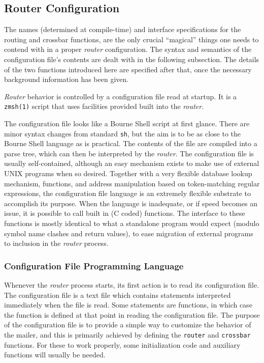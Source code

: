 \subsection{Router Configuration}



The names (determined at compile-time) and interface specifications for the
routing and crossbar functions, are the only crucial ``magical'' things one
needs to contend with in a proper {\em router\/} configuration.  The syntax and
semantics of the configuration file's contents are dealt with in the
following subsection. The details of the two functions introduced here are
specified after that, once the necessary background information has been
given.

{\em Router\/} behavior is controlled by a configuration file read at 
startup. It is a {\tt zmsh(1)} script that uses facilities provided 
built into the {\em router\/}. 

The configuration file looks like a Bourne Shell script at first glance.
There are minor syntax changes from standard {\tt sh}, but the aim is to be as
close to the Bourne Shell language as is practical. The contents of the
file are compiled into a parse tree, which can then be interpreted by the
{\em router\/}.  The configuration file is usually self-contained, although an easy
mechanism exists to make use of external UNIX programs when so desired.
Together with a very flexible database lookup mechanism, functions, and
address manipulation based on token-matching regular expressions, the
configuration file language is an extremely flexible substrate to
accomplish its purpose. When the language is inadequate, or if speed
becomes an issue, it is possible to call built in (C coded) functions. The
interface to these functions is mostly identical to what a standalone
program would expect (modulo symbol name clashes and return values), to
ease migration of external programs to inclusion in the {\em router\/} process.




\subsubsection{Configuration File Programming Language}



Whenever the {\em router\/} process starts, its first action is to read its
configuration file.  The configuration file is a text file which contains
statements interpreted immediately when the file is read.  Some statements
are functions, in which case the function is defined at that point in
reading the configuration file.  The purpose of the configuration file is
to provide a simple way to customize the behavior of the mailer, and this
is primarily achieved by defining the {\tt router} and {\tt crossbar} 
functions. For these to work properly, some initialization code and auxiliary
functions will usually be needed.

